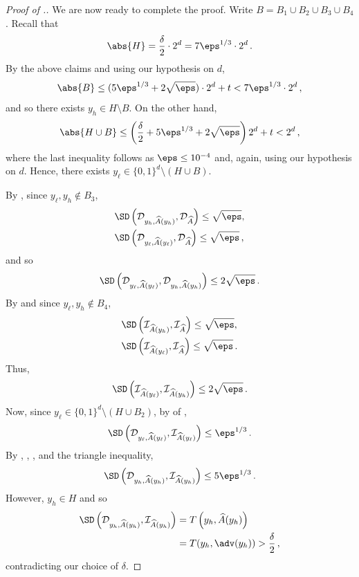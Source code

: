 \documentclass{toc}
\begin{document}
\begin{proof}[Proof of .]
We are now ready to complete the proof. Write $B = B_1 \cup B_2 \cup B_3 \cup B_4$. Recall that \[\abs{H} = \frac{\delta}{2}\cdot 2^d = 7\eps^{1/3} \cdot 2^d\,.\]
By the above claims and using our hypothesis on $d$,
\[
\abs{B} \leq (5\eps^{1/3} + 2\sqrt{\eps})\cdot 2^d + t < 7\eps^{1/3} \cdot 2^d\,,
\]
and so there exists $y_h \in H \setminus B$.  On the other hand, 
\[
\abs{H \cup B} \le \left(\frac{\delta}{2} + 5\eps^{1/3} + 2\sqrt{\eps}  \right) 2^d + t < 2^d\,,
\]
where the last inequality follows as $\eps \leq 10^{-4}$ and, again, using our hypothesis on $d$. Hence, there exists $y_\ell \in \{0,1\}^d \setminus (H \cup B)$. 

By , since $y_\ell,y_h \notin B_3$,
\begin{align*}
&\SD\left(\mathcal{D}_{y_h,\widehat{A}(y_h)}, \mathcal{D}_{\widehat{A}} \right) \le \sqrt{\eps}, \\
&\SD\left(\mathcal{D}_{y_\ell,\widehat{A}(y_\ell)}, \mathcal{D}_{\widehat{A}} \right) \le \sqrt{\eps}\,,
\end{align*}
and so
\begin{equation}\label{eq:dldh}
\SD\left(\mathcal{D}_{y_\ell,\widehat{A}(y_\ell)}, \mathcal{D}_{y_h,\widehat{A}(y_h)}\right) \le 2\sqrt{\eps}\,.
\end{equation}
By  and since $y_\ell,y_h \notin B_4$,
\begin{align*}
&\SD\left(\mathcal{I}_{\widehat{A}(y_h)}, \mathcal{I}_{\widehat{A}} \right) \le \sqrt{\eps}, \\
&\SD\left(\mathcal{I}_{\widehat{A}(y_\ell)}, \mathcal{I}_{\widehat{A}} \right) \le \sqrt{\eps}\,.
\end{align*}
Thus,
\begin{equation}\label{eq:ilih}
\SD\left(\mathcal{I}_{\widehat{A}(y_\ell)}, \mathcal{I}_{\widehat{A}(y_h)} \right) \le 2\sqrt{\eps}\,.
\end{equation}
Now, since $y_\ell \in \{0,1\}^d \setminus (H \cup B_2)$, by  of ,
\begin{equation}\label{eq:dlil}
\SD\left(\mathcal{D}_{y_\ell,\widehat{A}(y_\ell)}, \mathcal{I}_{\widehat{A}(y_\ell)}\right) \le \eps^{1/3}\,.
\end{equation}
By , , , and the triangle inequality,
\[
\SD\left(\mathcal{D}_{y_h,\widehat{A}(y_h)}, \mathcal{I}_{\widehat{A}(y_h)}\right) \le 5 \eps^{1/3}\,.
\]
However, $y_h \in H$ and so
\begin{align*}
\SD\left( \mathcal{D}_{y_h,\widehat{A}(y_h)}, \mathcal{I}_{\widehat{A}(y_h)} \right) &= T\left(y_h,\widehat{A}(y_h)\right) \\
&= T(y_h, \adv(y_h)) > \frac{\delta}{2}\,,
\end{align*}
contradicting our choice of $\delta$.
\end{proof}
\end{document}
